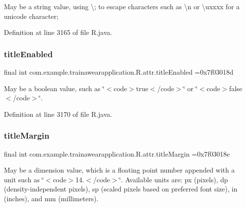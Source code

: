 May be a string value, using \textquotesingle{}\textbackslash{};\textquotesingle{} to escape characters such as \textquotesingle{}\textbackslash{}n\textquotesingle{} or \textquotesingle{}\textbackslash{}uxxxx\textquotesingle{} for a unicode character; 

Definition at line 3165 of file R.\+java.

\mbox{\label{classcom_1_1example_1_1trainawearapplication_1_1_r_1_1attr_aa71a8005aef3f335d3ba175b70a4bd50}} 
\subsubsection{\texorpdfstring{titleEnabled}{titleEnabled}}
{\footnotesize\ttfamily final int com.\+example.\+trainawearapplication.\+R.\+attr.\+title\+Enabled =0x7f03018d\hspace{0.3cm}{\ttfamily [static]}}

May be a boolean value, such as \char`\"{}$<$code$>$true$<$/code$>$\char`\"{} or \char`\"{}$<$code$>$false$<$/code$>$\char`\"{}. 

Definition at line 3170 of file R.\+java.

\mbox{\label{classcom_1_1example_1_1trainawearapplication_1_1_r_1_1attr_a8bf14640d51c5af9fe22db8ed09e9d6b}} 
\subsubsection{\texorpdfstring{titleMargin}{titleMargin}}
{\footnotesize\ttfamily final int com.\+example.\+trainawearapplication.\+R.\+attr.\+title\+Margin =0x7f03018e\hspace{0.3cm}{\ttfamily [static]}}

May be a dimension value, which is a floating point number appended with a unit such as \char`\"{}$<$code$>$14.\+5sp$<$/code$>$\char`\"{}. Available units are\+: px (pixels), dp (density-\/independent pixels), sp (scaled pixels based on preferred font size), in (inches), and mm (millimeters). 

